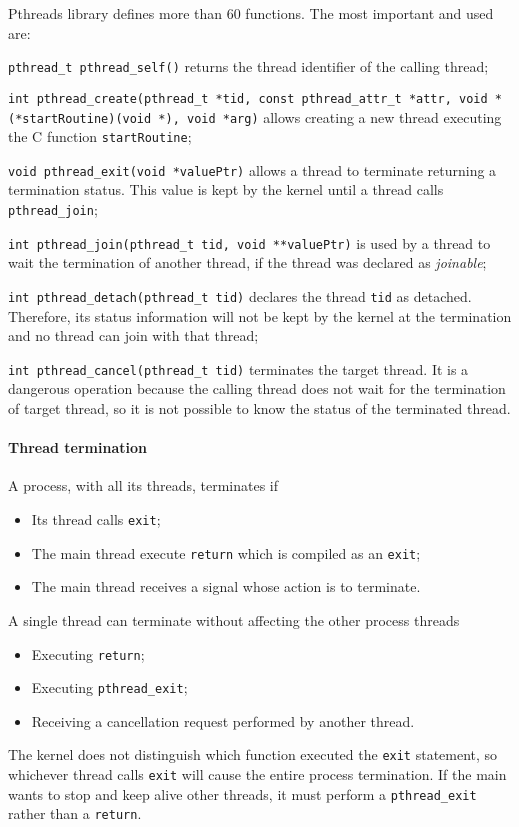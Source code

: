 Pthreads library defines more than 60 functions. The most important and used are:
\begin{description}
\item \texttt{pthread\_t pthread\_self()} returns the thread identifier of the calling thread;
\item \texttt{int pthread\_create(pthread\_t *tid, const pthread\_attr\_t *attr, \newline void *(*startRoutine)(void *), void *arg)} allows creating a new thread executing the C function \texttt{startRoutine};
\item \texttt{void pthread\_exit(void *valuePtr)} allows a thread to terminate returning a termination status. This value is kept by the kernel until a thread calls \texttt{pthread\_join};
\item \texttt{int pthread\_join(pthread\_t tid, void **valuePtr)} is used by a thread to wait the termination of another thread, if the thread was declared as \emph{joinable};
\item \texttt{int pthread\_detach(pthread\_t tid)} declares the thread \texttt{tid} as detached. Therefore, its status information will not be kept by the kernel at the termination and no thread can join with that thread;
\item \texttt{int pthread\_cancel(pthread\_t tid)} terminates the target thread. It is a dangerous operation because the calling thread does not wait for the termination of target thread, so it is not possible to know the status of the terminated thread.
\end{description}

\paragraph{Thread termination}
A process, with all its threads, terminates if
\begin{itemize}
\item Its thread calls \texttt{exit};
\item The main thread execute \texttt{return} which is compiled as an \texttt{exit};
\item The main thread receives a signal whose action is to terminate.
\end{itemize}
A single thread can terminate without affecting the other process threads
\begin{itemize}
\item Executing \texttt{return};
\item Executing \texttt{pthread\_exit};
\item Receiving a cancellation request performed by another thread.
\end{itemize}

The kernel does not distinguish which
function executed the \texttt{exit} statement, so whichever thread calls \texttt{exit} will cause the entire process termination.
If the main wants to stop and keep alive
other threads, it must perform a \texttt{pthread\_exit} rather than a \texttt{return}.